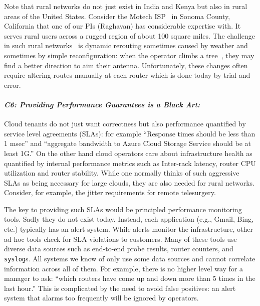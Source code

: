 Note that rural networks do not just exist in India and Kenya but also in rural areas of the United States. Consider the Motech ISP~\cite{barath} in Sonoma County, California that one of our PIs (Raghavan) has considerable expertise with. It serves rural users across a rugged region of about 100 square miles. The challenge in such rural networks~\cite{barath} is dynamic rerouting sometimes caused by weather and sometimes by simple reconfiguration: when the operator climbs a tree~\cite{barath}, they may find a better direction to aim their antenna.  Unfortunately, these changes often require altering routes manually at each router which is done today by trial and error.

\paragraph*{\em C6: Providing Performance Guarantees is a Black Art:}
Cloud tenants do not just want correctness but also performance quantified by service level agreements (SLAs): for example ``Response times should be less than 1 msec'' and ``aggregate bandwidth to Azure Cloud Storage Service should be at least 1G.''
On the other hand cloud operators care about infrastructure health as quantified by internal performance metrics such as Inter-rack latency, router CPU utilization and router stability.  While
one normally thinks of such aggressive SLAs as being necessary for large clouds, they are also
needed for rural networks.  Consider, for example, the jitter requirements for remote telesurgery.

The key to providing such SLAs would be principled performance monitoring tools. Sadly they do not exist today. Instead, each application (e.g., Gmail, Bing, etc.) typically has an alert system. While alerts monitor the infrastructure, other ad hoc tools check for SLA violations to customers.  Many of these tools use diverse data sources such as end-to-end probe results, router counters, and \texttt{syslog}s.  All systems we know of only use some data sources and cannot correlate information across all of them.  For example, there is no higher level way for a manager to ask: ``which routers have come up and down more than 5 times in the last hour.''  This is complicated by the need to avoid false positives: an alert system that alarms too frequently will be ignored by operators.

